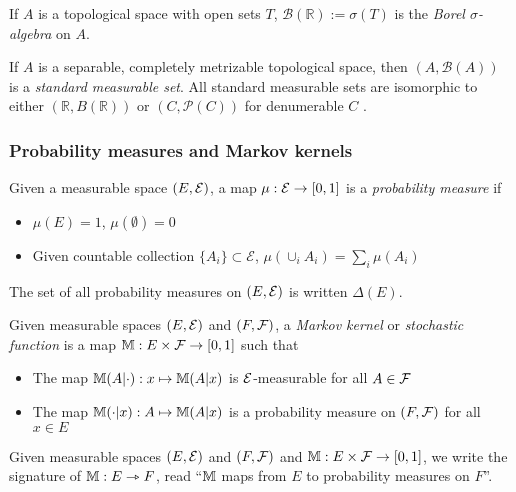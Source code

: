 If $A$ is a topological space with open sets $T$, $\mathcal{B}(\mathbb{R}):=\sigma(T)$ is the \emph{Borel $\sigma$-algebra} on $A$.

If $A$ is a separable, completely metrizable topological space, then $(A,\mathcal{B}(A))$ is a \emph{standard measurable set}. All standard measurable sets are isomorphic to either $(\mathbb{R},B(\mathbb{R}))$ or $(C,\mathscr{P}(C))$ for denumerable $C$ \citep[Chap. 1]{cinlar_probability_2011}.

\subsubsection{Probability measures and Markov kernels}

\begin{definition}
Given a measurable space $(E,\mathcal{E})$, a map $\mu:\mathcal{E}\to [0,1]$ is a \emph{probability measure} if
\begin{itemize}
	\item $\mu(E)=1$, $\mu(\emptyset)=0$
	\item Given countable collection $\{A_i\}\subset\mathscr{E}$, $\mu(\cup_{i} A_i) = \sum_i \mu(A_i)$
\end{itemize}
\end{definition}

\begin{notation}
The set of all probability measures on $(E,\mathcal{E})$ is written $\Delta(E)$.
\end{notation}

\begin{definition}
Given measurable spaces $(E,\mathcal{E})$ and $(F,\mathcal{F})$, a \emph{Markov kernel} or \emph{stochastic function} is a map $\mathbb{M}:E\times\mathcal{F}\to [0,1]$ such that
\begin{itemize}
	\item The map $\mathbb{M}(A|\cdot):x\mapsto \mathbb{M}(A|x)$ is $\mathcal{E}$-measurable for all $A\in \mathcal{F}$
	\item The map $\mathbb{M}(\cdot|x):A\mapsto \mathbb{M}(A|x)$ is a probability measure on $(F,\mathcal{F})$ for all $x\in E$
\end{itemize}
\end{definition}

\begin{notation}
Given measurable spaces $(E,\mathcal{E})$ and $(F,\mathcal{F})$ and $\mathbb{M}:E\times\mathcal{F}\to [0,1]$, we write the signature of $\mathbb{M}:E\rightarrowtriangle F$, read ``$\mathbb{M}$ maps from $E$ to probability measures on $F$''.
\end{notation}

